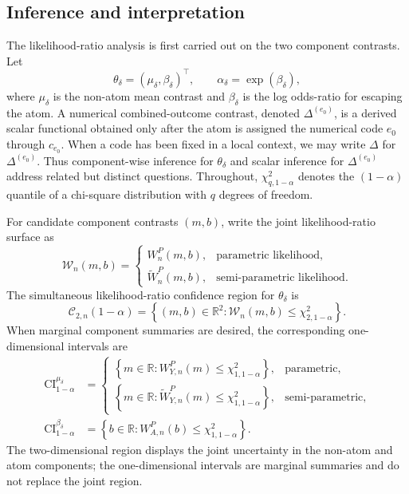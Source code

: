\documentclass[11pt]{article}
\begin{document}
\subsection{Inference and interpretation}

The likelihood-ratio analysis is first carried out on the two component contrasts. Let
\[
  \theta_\delta=(\mu_\delta,\beta_\delta)^\top,
  \qquad
  \alpha_\delta=\exp(\beta_\delta),
\]
where $\mu_\delta$ is the non-atom mean contrast and $\beta_\delta$ is the log odds-ratio for escaping the atom. A numerical combined-outcome contrast, denoted $\Delta^{(e_0)}$, is a derived scalar functional obtained only after the atom is assigned the numerical code $e_0$ through $c_{e_0}$. When a code has been fixed in a local context, we may write $\Delta$ for $\Delta^{(e_0)}$. Thus component-wise inference for $\theta_\delta$ and scalar inference for $\Delta^{(e_0)}$ address related but distinct questions. Throughout, $\chi^2_{q,1-\alpha}$ denotes the $(1-\alpha)$ quantile of a chi-square distribution with $q$ degrees of freedom.

For candidate component contrasts $(m,b)$, write the joint likelihood-ratio surface as
\begin{equation}
  \mathcal{W}_n(m,b)
  =
  \begin{cases}
    W_n^P(m,b), & \text{parametric likelihood},\\[0.4em]
    \widetilde{W}_n^P(m,b), & \text{semi-parametric likelihood}.
  \end{cases}
  \label{eq:generic-lr-surface}
\end{equation}
The simultaneous likelihood-ratio confidence region for $\theta_\delta$ is
\begin{equation}
  \mathcal{C}_{2,n}(1-\alpha)
  =
  \left\{
    (m,b)\in\mathbb{R}^2:
    \mathcal{W}_n(m,b)\leq\chi^2_{2,1-\alpha}
  \right\}.
  \label{eq:component-simultaneous-region}
\end{equation}
When marginal component summaries are desired, the corresponding one-dimensional intervals are
\begin{align*}
  \mathrm{CI}^{\mu_\delta}_{1-\alpha}
  &=
  \begin{cases}
    \left\{m\in\mathbb{R}:W_{Y,n}^P(m)\leq\chi^2_{1,1-\alpha}\right\},
      & \text{parametric},\\[0.4em]
    \left\{m\in\mathbb{R}:\widetilde{W}_{Y,n}^P(m)\leq\chi^2_{1,1-\alpha}\right\},
      & \text{semi-parametric},
  \end{cases}\\
  \mathrm{CI}^{\beta_\delta}_{1-\alpha}
  &=
  \left\{b\in\mathbb{R}:W_{A,n}^P(b)\leq\chi^2_{1,1-\alpha}\right\}.
\end{align*}
The two-dimensional region displays the joint uncertainty in the non-atom and atom components; the one-dimensional intervals are marginal summaries and do not replace the joint region.
\end{document}
